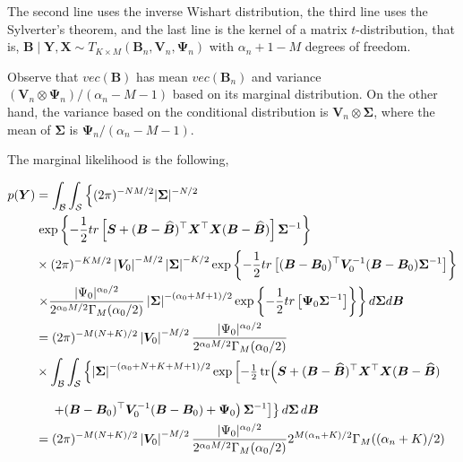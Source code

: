 The second line uses the inverse Wishart distribution, the third line uses the Sylverter's theorem, and the last line is the kernel of a matrix $t$-distribution, that is, ${\bm{B}}\mid {\bm{Y}},{\bm{X}}\sim T_{K\times M}({\bm{B}}_n,{\bm{V}}_n,{\bm{\Psi}}_n)$ with $\alpha_n+1-M$ degrees of freedom. 

Observe that $vec({\bm{B}})$ has mean $vec({\bm{B}}_n)$ and variance $({\bm{V}}_n\otimes{\bm{\Psi}}_n)/(\alpha_n-M-1)$ based on its marginal distribution. On the other hand, the variance based on the conditional distribution is ${\bm{V}}_n\otimes{\bm{\Sigma}}$, where the mean of ${\bm{\Sigma}}$ is ${\bm{\Psi}}_n/(\alpha_n-M-1)$.   

The marginal likelihood is the following,

\begin{align*}
	\allowdisplaybreaks
	p({\bm{Y}})&=\int_{\mathcal{B}}\int_{\mathcal{S}}\left\{ (2\pi)^{-NM/2} |{{\bm \Sigma}}|^{-N/2}\right.\\
	&\left.\exp\left\lbrace -\frac{1}{2}tr\left[{\bm{S}}+({\bm{B}}-\widehat{\bm{B}})^{\top}{\bm{X}}^{\top}{\bm{X}}({\bm{B}}-\widehat{\bm{B}})\right]{{\bm \Sigma}}^{-1}\right\rbrace\right.\\
	&\times (2\pi)^{-KM/2}\left|{\bm V}_0 \right|^{-M/2} \left|{\bm{\Sigma}} \right|^{-K/2}\exp\left\lbrace -\frac{1}{2}tr\left[({\bm{B}}-{\bm{B}}_{0})^{\top}{\bm{V}}_{0}^{-1}({\bm{B}}-{\bm{B}}_{0}){\bm \Sigma}^{-1}\right]\right\rbrace \\
	&\left. \times \frac{|\Psi_0|^{\alpha_0/2}}{2^{\alpha_0M/2}\Gamma_M(\alpha_0/2)} \left|{\bm \Sigma} \right|^{-(\alpha_{0}+M+1)/2}\exp\left\lbrace -\frac{1}{2}tr \left[ {\bm{\Psi}}_{0} {\bm \Sigma}^{-1}\right] \right\rbrace \right\} d{\bm{\Sigma}} d{\bm B}\\
	&=(2\pi)^{-M(N+K)/2}\left|{\bm V}_0\right|^{-M/2}\frac{|\Psi_0|^{\alpha_0/2}}{2^{\alpha_0M/2}\Gamma_M(\alpha_0/2)}\\
	&\times \int_{\mathcal{B}}\int_{\mathcal{S}} 
	\left\{ 
	\left|{\bm{\Sigma}}\right|^{-(\alpha_{0}+N+K+M+1)/2}
	\exp\left[
	-\tfrac{1}{2}\operatorname{tr}\!\left(
	{\bm{S}}
	+({\bm{B}}-\widehat{\bm{B}})^{\top}{\bm{X}}^{\top}{\bm{X}}({\bm{B}}-\widehat{\bm{B}})
	\right.\right.\right. \\[2ex]
	&\quad \left.\left.\left.
	+({\bm{B}}-{\bm{B}}_{0})^{\top}{\bm{V}}_{0}^{-1}({\bm{B}}-{\bm{B}}_{0})
	+{\bm{\Psi}}_0
	\right){\bm{\Sigma}}^{-1}
	\right]
	\right\} d{\bm{\Sigma}}\, d{\bm{B}}\\
	&=(2\pi)^{-M(N+K)/2}\left|{\bm V}_0\right|^{-M/2}\frac{|\Psi_0|^{\alpha_0/2}}{2^{\alpha_0M/2}\Gamma_M(\alpha_0/2)}2^{M(\alpha_n+K)/2}\Gamma_M((\alpha_n+K)/2)\\

\end{align*}
